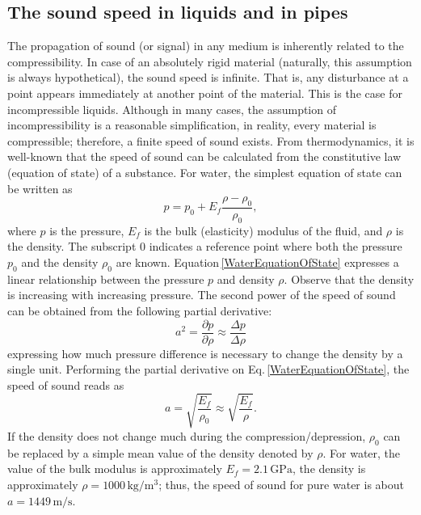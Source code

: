 \subsection{The sound speed in liquids and in pipes}
The propagation of sound (or signal) in any medium is inherently related to the compressibility. In case of an absolutely rigid material (naturally, this assumption is always hypothetical), the sound speed is infinite. That is, any disturbance at a point appears immediately at another point of the material. This is the case for incompressible liquids. Although in many cases, the assumption of incompressibility is a reasonable simplification, in reality, every material is compressible; therefore, a finite speed of sound exists. From thermodynamics, it is well-known that the speed of sound can be calculated from the constitutive law (equation of state) of a substance. For water, the simplest equation of state can be written as
%
\begin{equation} \label{WaterEquationOfState}
p = p_0 + E_f \frac{\rho - \rho_0}{\rho_0},
\end{equation}
%
where $p$ is the pressure, $E_f$ is the bulk (elasticity) modulus of the fluid, and $\rho$ is the density. The subscript $0$ indicates a reference point where both the pressure $p_0$ and the density $\rho_0$ are known. Equation\,\eqref{WaterEquationOfState} expresses a linear relationship between the pressure $p$ and density $\rho$. Observe that the density is increasing with increasing pressure. The second power of the speed of sound can be obtained from the following partial derivative:
%
\begin{equation}
a^2 = \frac{\partial p}{\partial \rho} \approx \frac{\Delta p}{\Delta \rho}
\end{equation}
%
expressing how much pressure difference is necessary to change the density by a single unit. Performing the partial derivative on Eq.\,\ref{WaterEquationOfState}, the speed of sound reads as
%
\begin{equation}
a = \sqrt{ \frac{E_f}{\rho_0} } \approx \sqrt{ \frac{E_f}{\rho} }.
\end{equation}
%
If the density does not change much during the compression/depression, $\rho_0$ can be replaced by a simple mean value of the density denoted by $\rho$. For water, the value of the bulk modulus is approximately $E_f=2.1\,\mathrm{GPa}$, the density is approximately $\rho=1000\,\mathrm{kg/m^3}$; thus, the speed of sound for pure water is about $a=1449\,\mathrm{m/s}$.
 
